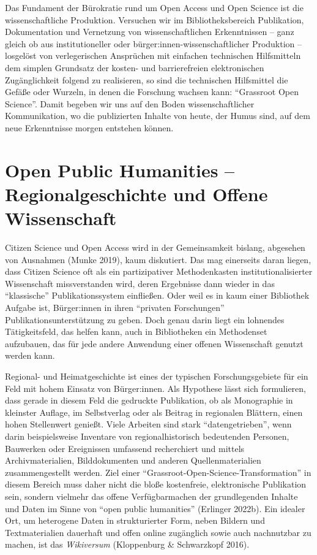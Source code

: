 \documentclass[a4paper,
fontsize=11pt,
oneside,
numbers=noperiodatend,
parskip=half-,
bibliography=totoc,
final
]{scrartcl}
\begin{document}
Das Fundament der Bürokratie rund um Open Access und Open Science ist
die wissenschaftliche Produktion. Versuchen wir im Bibliotheksbereich
Publikation, Dokumentation und Vernetzung von wissenschaftlichen
Erkenntnissen -- ganz gleich ob aus institutioneller oder
bürger:in\-nen-wissenschaftlicher Produktion -- losgelöst von
verlegerischen Ansprüchen mit einfachen technischen Hilfsmitteln dem
simplen Grundsatz der kosten- und barrierefreien elektronischen
Zugänglichkeit folgend zu realisieren, so sind die technischen
Hilfsmittel die Gefäße oder Wurzeln, in denen die Forschung wachsen
kann: \enquote{Grassroot Open Science}. Damit begeben wir uns auf den
Boden wissenschaftlicher Kommunikation, wo die publizierten Inhalte von
heute, der Humus sind, auf dem neue Erkenntnisse morgen entstehen
können.

\hypertarget{open-public-humanities-regionalgeschichte-und-offene-wissenschaft}{%
\section{Open Public Humanities -- Regionalgeschichte und Offene
Wissenschaft}\label{open-public-humanities-regionalgeschichte-und-offene-wissenschaft}}

Citizen Science und Open Access wird in der Gemeinsamkeit bislang,
abgesehen von Ausnahmen (Munke 2019), kaum diskutiert. Das mag
einerseits daran liegen, dass Citizen Science oft als ein partizipativer
Methodenkasten institutionalisierter Wissenschaft missverstanden wird,
deren Ergebnisse dann wieder in das \enquote{klassische}
Publikationssystem einfließen. Oder weil es in kaum einer Bibliothek
Aufgabe ist, Bürger:innen in ihren \enquote{privaten Forschungen}
Publikationsunterstützung zu geben. Doch genau darin liegt ein lohnendes
Tätigkeitsfeld, das helfen kann, auch in Bibliotheken ein Methodenset
aufzubauen, das für jede andere Anwendung einer offenen Wissenschaft
genutzt werden kann.

Regional- und Heimatgeschichte ist eines der typischen Forschungsgebiete
für ein Feld mit hohem Einsatz von Bürger:innen. Als Hypothese lässt
sich formulieren, dass gerade in diesem Feld die gedruckte Publikation,
ob als Monographie in kleinster Auflage, im Selbstverlag oder als
Beitrag in regionalen Blättern, einen hohen Stellenwert genießt. Viele
Arbeiten sind stark \enquote{datengetrieben}, wenn darin beispielsweise
Inventare von regionalhistorisch bedeutenden Personen, Bauwerken oder
Ereignissen umfassend recherchiert und mittels Archivmaterialien,
Bilddokumenten und anderen Quellenmaterialien zusammengestellt werden.
Ziel einer \enquote{Grassroot-Open-Science-Transformation} in diesem
Bereich muss daher nicht die bloße kostenfreie, elektronische
Publikation sein, sondern vielmehr das offene Verfügbarmachen der
grundlegenden Inhalte und Daten im Sinne von \enquote{open public
humanities} (Erlinger 2022b). Ein idealer Ort, um heterogene Daten in
strukturierter Form, neben Bildern und Textmaterialien dauerhaft und
offen online zugänglich sowie auch nachnutzbar zu machen, ist das
\emph{Wikiversum} (Kloppenburg \& Schwarzkopf 2016).
\end{document}
